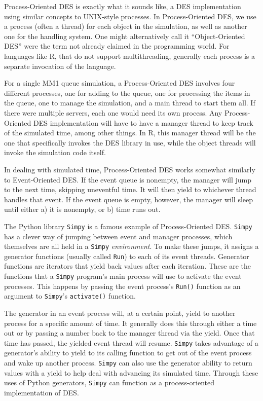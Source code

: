 \documentclass[a4paper, 11pt]{article} %
\begin{document}
Process-Oriented DES is exactly what it sounds like, a DES implementation using similar concepts to UNIX-style processes. In Process-Oriented DES, we use a process (often a thread) for each object in the simulation, as well as another one for the handling system. One might alternatively call it “Object-Oriented DES” were the term not already claimed in the programming world. For languages like R, that do not support multithreading, generally each process is a separate invocation of the language.

For a single MM1 queue simulation, a Process-Oriented DES involves four different processes, one for adding to the queue, one for processing the items in the queue, one to manage the simulation, and a main thread to start them all. If there were multiple servers, each one would need its own process. Any Process-Oriented DES implementation will have to have a manager thread to keep track of the simulated time, among other things. In R, this manager thread will be the one that specifically invokes the DES library in use, while the object threads will invoke the simulation code itself.

In dealing with simulated time, Process-Oriented DES works somewhat similarly to Event-Oriented DES. If the event queue is nonempty, the manager will jump to the next time, skipping uneventful time. It will then yield to whichever thread handles that event. If the event queue is empty, however, the manager will sleep until either a) it is nonempty, or b) time runs out. 

The Python library \texttt{Simpy} is a famous example of Process-Oriented DES. \texttt{Simpy} has a clever way of jumping between event and manager processes, which themselves are all held in a \texttt{Simpy} \textit{environment}. To make these jumps, it assigns a generator functions (usually called \texttt{Run}) to each of its event threads. Generator functions are iterators that yield back values after each iteration. These are the functions that a \texttt{Simpy} program’s main process will use to activate the event processes. This happens by passing the event process’s \texttt{Run()} function as an argument to \texttt{Simpy}’s \texttt{activate()} function.

The generator in an event process will, at a certain point, yield to another process for a specific amount of time. It generally does this through either a time out or by passing a number back to the manager thread via the yield. Once that time has passed, the yielded event thread will resume. \texttt{Simpy} takes advantage of a generator’s ability to yield to its calling function to get out of the event process and wake up another process. \texttt{Simpy} can also use the generator ability to return values with a yield to help deal with advancing its simulated time. Through these uses of Python generators, \texttt{Simpy} can function as a process-oriented implementation of DES.
\end{document}
